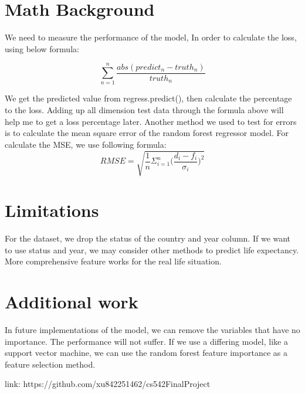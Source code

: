 \documentclass{article}
\begin{document}
\section{Math Background}
We need to measure the performance of the model, In order to calculate the loss, using below formula: 

$$ \sum_{n=1}^{n} \frac{abs(predict_{n} - truth_{n})}{truth_{n}}$$

We get the predicted value from regress.predict(), then calculate the percentage to the loss. Adding up all dimension test data through the formula above will help me to get a loss percentage later. Another method we used to test for errors is to calculate the mean square error of the random forest regressor model. For calculate the MSE, we use following formula: 
$$ RMSE = \sqrt{\frac{1}{n}\Sigma_{i=1}^{n}{\Big(\frac{d_i -f_i}{\sigma_i}\Big)^2}}$$

\section{Limitations}

For the dataset, we drop the status of the country and year column. If we want to use status and year, we may consider other methods to predict life expectancy. More comprehensive feature works for the real life situation.

\section{Additional work}
In future implementations of the model, we can remove the variables that have no importance. The performance will not suffer. If we use a differing model, like a support vector machine, we can use the random forest feature importance as a feature selection method. 

link: https://github.com/xu842251462/cs542FinalProject
\end{document}
